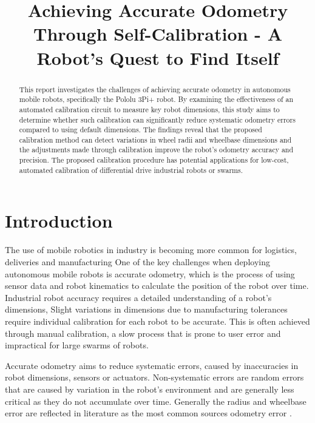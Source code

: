\documentclass[conference]{IEEEtran}
\begin{document}
\title{Achieving Accurate Odometry Through Self-Calibration - A Robot's Quest to Find Itself}

\author{
    \and
}

\maketitle

\begin{abstract}

This report investigates the challenges of achieving accurate odometry in autonomous mobile robots, specifically the Pololu 3Pi+ robot. 
By examining the effectiveness of an automated calibration circuit to measure key robot dimensions, this study aims to determine whether such calibration can significantly reduce systematic odometry errors compared to using default dimensions. 
The findings reveal that the proposed calibration method can detect variations in wheel radii and wheelbase dimensions and the adjustments made through calibration improve the robot's odometry accuracy and precision. 
The proposed calibration procedure has potential applications for low-cost, automated calibration of differential drive industrial robots or swarms.
\end{abstract}


\section{Introduction}\label{sec:intro}

The use of mobile robotics in industry is becoming more common for logistics, deliveries and manufacturing
One of the key challenges when deploying autonomous mobile robots is accurate odometry, which is the process of using sensor data and robot kinematics to calculate the position of the robot over time.
Industrial robot accuracy requires a detailed understanding of a robot's dimensions,
Slight variations in dimensions due to manufacturing tolerances require individual calibration for each robot to be accurate.
This is often achieved through manual calibration, a slow process that is prone to user error and impractical for large swarms of robots. 

Accurate odometry aims to reduce systematic errors, caused by inaccuracies in robot dimensions, sensors or actuators. Non-systematic errors are random errors that are caused by variation in the robot's environment and are generally less critical as they do not accumulate over time.
Generally the radius and wheelbase error are reflected in literature as the most common sources odometry error \cite{UMBmark, width-radius}.
\end{document}
